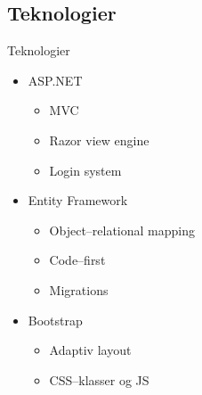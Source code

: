 		\subsection{Teknologier}
			\begin{frame}[t]{Teknologier} %
				\begin{itemize}
					\item ASP.NET
					\begin{itemize}
						\item MVC
						\item Razor view engine
						\item Login system
					\end{itemize}
					\item Entity Framework
					\begin{itemize}
						\item Object--relational mapping
						\item Code--first
						\item Migrations
					\end{itemize}
					\item Bootstrap
					\begin{itemize}
						\item Adaptiv layout
						\item CSS--klasser og JS
					\end{itemize}
				\end{itemize}
			\end{frame}


